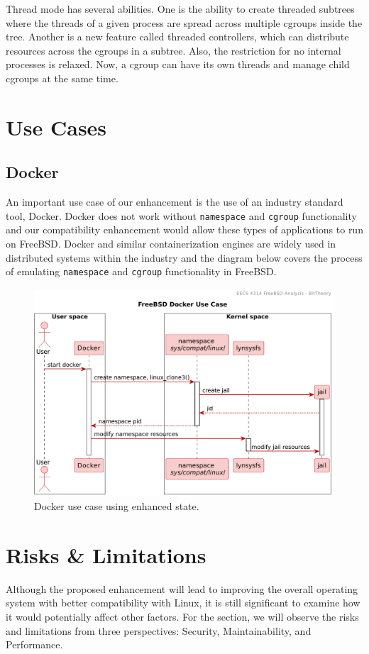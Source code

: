 \documentclass[12pt, dvipsnames, a4paper]{article}
\newcommand{\code}[1]{\texttt{#1}}
\begin{document}
Thread mode has several abilities. One is the ability to create threaded subtrees where the threads of a given process are spread across multiple cgroups inside the tree. Another is a new feature called threaded controllers, which can distribute resources across the cgroups in a subtree. Also, the restriction for no internal processes is relaxed. Now, a cgroup can have its own threads and manage child cgroups at the same time.
\clearpage

\section{Use Cases}
\subsection{Docker}
An important use case of our enhancement is the use of an industry standard tool, Docker. Docker does not work without \code{namespace} and \code{cgroup} functionality and our compatibility enhancement would allow these types of applications to run on FreeBSD. Docker and similar containerization engines are widely used in distributed systems within the industry and the diagram below covers the process of emulating \code{namespace} and \code{cgroup} functionality in FreeBSD.
\begin{figure}[!htb]
	\center
	\includegraphics[width = 500pt]{assets/sequence_diagrams/docker.pdf}
	\caption{Docker use case using enhanced state.}
\end{figure}
\clearpage

\section{Risks \& Limitations}
Although the proposed enhancement will lead to improving the overall operating system with better compatibility with Linux, it is still significant to examine how it would potentially affect other factors. For the section, we will observe the risks and limitations from three perspectives: Security, Maintainability, and Performance.
\end{document}
